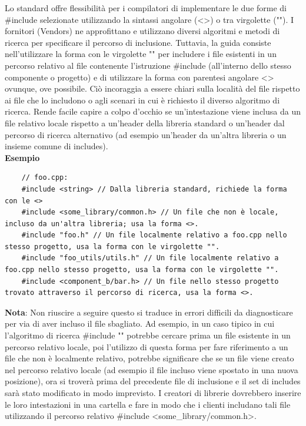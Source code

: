 \textsf{\small Lo standard offre flessibilità per i compilatori di implementare le due forme di \#include selezionate utilizzando la sintassi angolare (<>) o tra virgolette (""). I fornitori (Vendors) ne approfittano e utilizzano diversi algoritmi e metodi di ricerca per specificare il percorso di inclusione. Tuttavia, la guida consiste nell'utilizzare la forma con le virgolette "" per includere i file esistenti in un percorso relativo al file contenente l'istruzione \#include (all'interno dello stesso componente o progetto) e di utilizzare la forma con parentesi angolare <> ovunque, ove possibile. Ciò incoraggia a essere chiari sulla località del file rispetto ai file che lo includono o agli scenari in cui è richiesto il diverso algoritmo di ricerca. Rende facile capire a colpo d'occhio se un'intestazione viene inclusa da un file relativo locale rispetto a un'header della libreria standard o un'header dal percorso di ricerca alternativo (ad esempio un'header da un'altra libreria o un insieme comune di includes).} \\

\textsf{\small \textbf{Esempio}}

\begin{lstlisting}
	// foo.cpp:
	#include <string> // Dalla libreria standard, richiede la forma con le <>
	#include <some_library/common.h> // Un file che non è locale, incluso da un'altra libreria; usa la forma <>.
	#include "foo.h" // Un file localmente relativo a foo.cpp nello stesso progetto, usa la forma con le virgolette "".
	#include "foo_utils/utils.h" // Un file localmente relativo a foo.cpp nello stesso progetto, usa la forma con le virgolette "".
	#include <component_b/bar.h> // Un file nello stesso progetto trovato attraverso il percorso di ricerca, usa la forma <>.
\end{lstlisting}

\textsf{\small \textbf{Nota}: Non riuscire a seguire questo si traduce in errori difficili da diagnosticare per via di aver incluso il file sbagliato. Ad esempio, in un caso tipico in cui l'algoritmo di ricerca \#include "" potrebbe cercare prima un file esistente in un percorso relativo locale, poi l'utilizzo di questa forma per fare riferimento a un file che non è localmente relativo, potrebbe significare che se un file viene creato nel percorso relativo locale (ad esempio il file incluso viene spostato in una nuova posizione), ora si troverà prima del precedente file di inclusione e il set di includes sarà stato modificato in modo imprevisto. I creatori di librerie dovrebbero inserire le loro intestazioni in una cartella e fare in modo che i clienti includano tali file utilizzando il percorso relativo \#include <some\_library/common.h>.} \\ %

